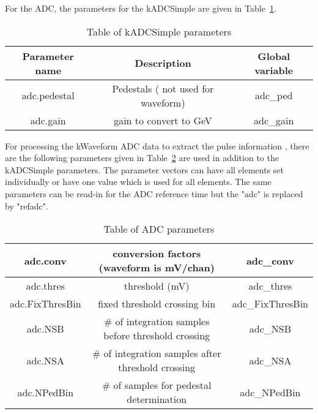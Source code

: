 \documentclass[11pt]{article}
\begin{document}
For the ADC, the parameters for the kADCSimple are given in Table~\ref{tab:adcsimpleparam}.
\begin{table}[h]
\begin{center}
	\begin{tabular}{|c|c|c|}
		\hline 
		Parameter name	& Description &  Global variable\\ 
		\hline 
		adc.pedestal	&  Pedestals ( not used for waveform) & adc\_ped \\ 
		\hline 
		adc.gain	&  gain to convert to GeV & adc\_gain\\ 
		\hline
	\end{tabular} 
\caption{Table of kADCSimple parameters}\label{tab:adcsimpleparam}
\end{center}
\end{table}
For processing the kWaveform ADC data to extract the pulse information , there are the following parameters
given in Table~\ref{tab:adcwaveparam} are used in addition to the kADCSimple parameters. The parameter vectors can have all elements set individually or have one value which is used for all elements.  
The same parameters can be read-in for the ADC reference time but the "adc" is replaced by "refadc".
\begin{table}[h]
	\begin{center}
		\begin{tabular}{|c|c|c|}
		\hline 
        adc.conv	&  conversion factors  (waveform is mV/chan) & adc\_conv\\ 
		\hline 
adc.thres	&  threshold  (mV) & adc\_thres\\ 
\hline 
adc.FixThresBin	&  fixed threshold crossing bin  & adc\_FixThresBin\\ 
\hline 
adc.NSB	&  \# of integration samples before threshold crossing  & adc\_NSB\\ 
\hline 
adc.NSA	&  \# of integration samples after threshold crossing  & adc\_NSA\\ 
\hline 
adc.NPedBin	&  \# of samples for pedestal determination  & adc\_NPedBin\\ 
\hline 
	\end{tabular} 
\caption{Table of ADC parameters}\label{tab:adcwaveparam}
\end{center}
\end{table}
\end{document}
